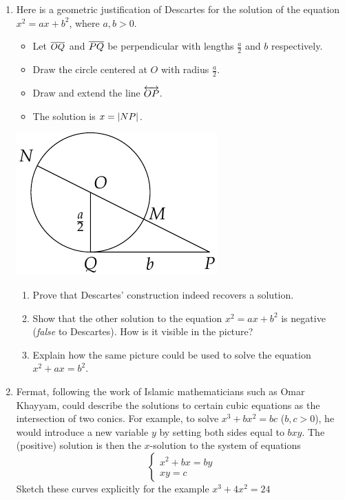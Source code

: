 \begin{exercises}{}{}
\begin{enumerate}
	  \item Here is a geometric justification of Descartes for the solution of the equation $x^2=ax+b^2$, where $a,b>0$.
	  \par
		\begin{minipage}[t]{0.6\linewidth}\vspace{-5pt}
			\begin{itemize}\itemsep0pt
			  \item Let $\overline{OQ}$ and $\overline{PQ}$ be perpendicular with lengths $\frac a2$ and $b$ respectively.
			  \item Draw the circle centered at $O$ with radius $\frac a2$.
			  \item Draw and extend the line $\overleftrightarrow{OP}$.
			  \item The solution is $x=\left| NP\right|$.
			\end{itemize}
		\end{minipage}
		\hfill
		\begin{minipage}[t]{0.35\linewidth}\vspace{-10pt}
			\includegraphics{descartes-quad}
		\end{minipage}\par\vspace{-10pt}
		\begin{enumerate}
		  \item Prove that Descartes' construction indeed recovers a solution.
	  
		  \item Show that the other solution to the equation $x^2=ax+b^2$ is negative (\emph{false} to Descartes). How is it visible in the picture?
	  	
		  \item Explain how the same picture could be used to solve the equation $x^2+ax=b^2$.
		\end{enumerate}
		
		\item Fermat, following the work of Islamic mathematicians such as Omar Khayyam, could describe the solutions to certain cubic equations as the intersection of two conics. For example, to solve $x^3+bx^2=bc$ ($b,c>0$), he would introduce a new variable $y$ by setting both sides equal to $b xy$. The (positive) solution is then the $x$-solution to the system of equations
	\[
		\begin{cases}
			x^2+bx=by\\
			xy=c
		\end{cases}
	\]
	Sketch these curves explicitly for the example $x^3+4x^2=24$
	\end{enumerate}
\end{exercises}

